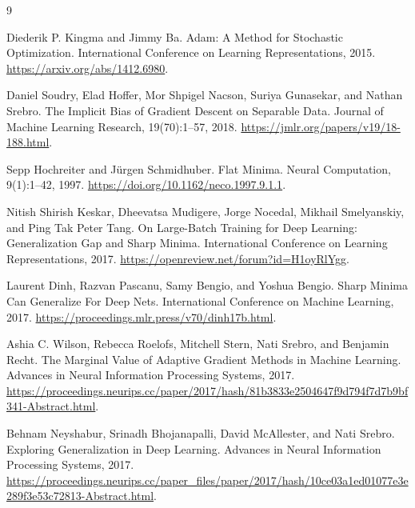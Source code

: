 \documentclass[11pt]{article}
\begin{document}
\begin{thebibliography}{9}

Diederik P. Kingma and Jimmy Ba.
\newblock Adam: A Method for Stochastic Optimization.
\newblock International Conference on Learning Representations, 2015.
\newblock \url{https://arxiv.org/abs/1412.6980}.

Daniel Soudry, Elad Hoffer, Mor Shpigel Nacson, Suriya Gunasekar, and Nathan Srebro.
\newblock The Implicit Bias of Gradient Descent on Separable Data.
\newblock Journal of Machine Learning Research, 19(70):1--57, 2018.
\newblock \url{https://jmlr.org/papers/v19/18-188.html}.

Sepp Hochreiter and J\"urgen Schmidhuber.
\newblock Flat Minima.
\newblock Neural Computation, 9(1):1--42, 1997.
\newblock \url{https://doi.org/10.1162/neco.1997.9.1.1}.

Nitish Shirish Keskar, Dheevatsa Mudigere, Jorge Nocedal, Mikhail Smelyanskiy, and Ping Tak Peter Tang.
\newblock On Large-Batch Training for Deep Learning: Generalization Gap and Sharp Minima.
\newblock International Conference on Learning Representations, 2017.
\newblock \url{https://openreview.net/forum?id=H1oyRlYgg}.

Laurent Dinh, Razvan Pascanu, Samy Bengio, and Yoshua Bengio.
\newblock Sharp Minima Can Generalize For Deep Nets.
\newblock International Conference on Machine Learning, 2017.
\newblock \url{https://proceedings.mlr.press/v70/dinh17b.html}.

Ashia C. Wilson, Rebecca Roelofs, Mitchell Stern, Nati Srebro, and Benjamin Recht.
\newblock The Marginal Value of Adaptive Gradient Methods in Machine Learning.
\newblock Advances in Neural Information Processing Systems, 2017.
\newblock \url{https://proceedings.neurips.cc/paper/2017/hash/81b3833e2504647f9d794f7d7b9bf341-Abstract.html}.

Behnam Neyshabur, Srinadh Bhojanapalli, David McAllester, and Nati Srebro.
\newblock Exploring Generalization in Deep Learning.
\newblock Advances in Neural Information Processing Systems, 2017.
\newblock \url{https://proceedings.neurips.cc/paper_files/paper/2017/hash/10ce03a1ed01077e3e289f3e53c72813-Abstract.html}.

\end{thebibliography}
\end{document}
